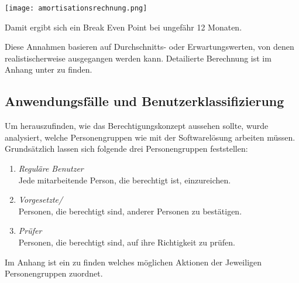 \texttt{[image: amortisationsrechnung.png]}

Damit ergibt sich ein Break Even Point bei ungefähr 12 Monaten.

Diese Annahmen basieren auf Durchschnitts- oder Erwartungswerten, von denen realistischerweise ausgegangen werden kann.
Detailierte Berechnung ist im Anhang unter  zu finden.

\subsection{Anwendungsfälle und Benutzerklassifizierung}
\label{sec:Analysephase:Benutzerklassifizierung}

Um herauszufinden, wie das Berechtigungskonzept aussehen sollte, wurde analysiert, welche Personengruppen wie mit der Softwarelösung arbeiten müssen.
Grundsätzlich lassen sich folgende drei Personengruppen feststellen:

\begin{enumerate}
    \item \emph{Reguläre Benutzer}\\
    Jede mitarbeitende Person, die berechtigt ist,  einzureichen.
    \item \emph{Vorgesetzte/}\\
    Personen, die berechtigt sind,  anderer Personen zu bestätigen.
    \item \emph{Prüfer}\\
    Personen, die berechtigt sind,  auf ihre Richtigkeit zu prüfen.
\end{enumerate}

Im Anhang ist ein  zu finden welches möglichen Aktionen der Jeweiligen Personengruppen zuordnet.